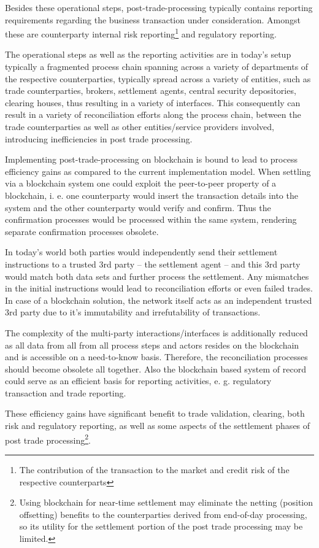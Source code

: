 Besides these operational steps, post-trade-processing typically contains reporting requirements regarding the business transaction under consideration. Amongst these are counterparty internal risk reporting\footnote{The contribution of the transaction to the market and credit risk of the respective counterparts} and regulatory reporting. 

The operational steps as well as the reporting activities are in today’s setup typically a fragmented process chain spanning across a variety of departments of the respective counterparties, typically spread across a variety of entities, such as trade counterparties, brokers, settlement agents, central security depositories, clearing houses, thus resulting in a variety of interfaces. This consequently can result in a variety of reconciliation efforts along the process chain, between the trade counterparties as well as other entities/service providers involved, introducing inefficiencies in post trade processing.

Implementing post-trade-processing on blockchain is bound to lead to process efficiency gains as compared to the current implementation model. When settling via a blockchain system one could exploit the peer-to-peer property of a blockchain, i. e. one counterparty would insert the transaction details into the system and the other counterparty would verify and confirm.  Thus the confirmation processes would be processed within the same system, rendering separate confirmation processes obsolete.

In today’s world both parties would independently send their settlement instructions to a trusted 3rd party – the settlement agent – and this 3rd party would match both data sets and further process the settlement. Any mismatches in the initial instructions would lead to reconciliation efforts or even failed trades. In case of a blockchain solution, the network itself acts as an independent trusted 3rd party due to it's immutability and irrefutability of transactions.

The complexity of the multi-party interactions/interfaces is additionally reduced as all data from all from all process steps and actors resides on the blockchain and is accessible on a need-to-know basis. Therefore, the reconciliation processes should become obsolete all together. Also the blockchain based system of record could serve as an efficient basis for reporting activities, e. g. regulatory transaction and trade reporting.

These efficiency gains have significant benefit to trade validation, clearing, both risk and regulatory reporting, as well as some aspects of the settlement phases of post trade processing\footnote{Using blockchain for near-time settlement may eliminate the netting (position offsetting) benefits to the counterparties derived from end-of-day processing, so its utility for the settlement portion of the post trade processing may be limited.}.

